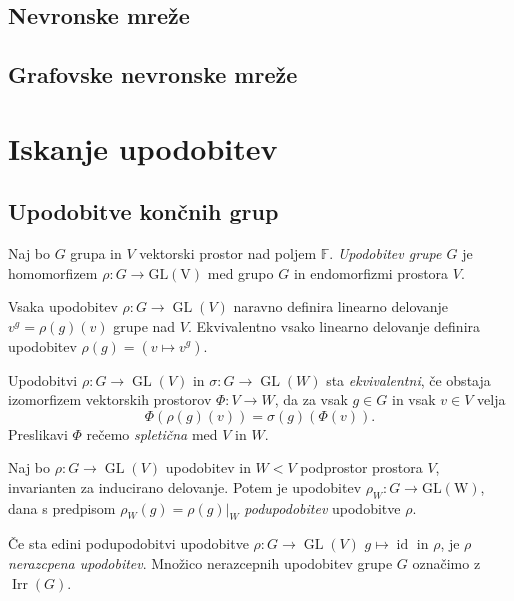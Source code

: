 \documentclass[mat2, tisk]{fmfdelo}
\begin{document}
    \subsection{Nevronske mreže}
    \subsection{Grafovske nevronske mreže}
\section{Iskanje upodobitev}
    \subsection{Upodobitve končnih grup}
    \begin{definicija}
        Naj bo $G$ grupa in $V$ vektorski prostor nad poljem $\mathbb{F}$. \emph{Upodobitev grupe $G$} je homomorfizem $ \rho \colon G \to \operatorname{GL(V)}$ med grupo $G$ in endomorfizmi prostora $V$.
    \end{definicija}
    Vsaka upodobitev $\rho \colon G \to \operatorname{GL}(V)$ naravno definira linearno delovanje $v ^ g = \rho(g)(v)$ grupe nad $V$. Ekvivalentno vsako linearno delovanje  definira upodobitev $\rho(g) = (v \mapsto v^g)$. 
    \begin{definicija}
        Upodobitvi $\rho \colon G \to \operatorname{GL}(V)$ in 
         $\sigma \colon G \to \operatorname{GL}(W)$ sta \emph{ekvivalentni}, če obstaja izomorfizem vektorskih prostorov $\Phi \colon  V \to W$, da za vsak $g \in G$ in vsak $v \in V$ velja 
         $$
         \Phi(\rho(g)(v)) = \sigma(g)(\Phi(v)).
         $$
         Preslikavi $\Phi$ rečemo \emph{spletična} med $V$ in $W$.
    \end{definicija}
    \begin{definicija}
        Naj bo $\rho: G \to \operatorname{GL}(V)$ upodobitev in $W < V$ podprostor prostora $V$, invarianten za inducirano delovanje. Potem je upodobitev
        $
        \rho_W \colon G \to \operatorname{GL(W)}
        $, dana s predpisom
        $\rho_W(g) = \rho(g)|_{W}$ \emph{podupodobitev} upodobitve $\rho$.
    \end{definicija}
    \begin{definicija}
        Če sta edini podupodobitvi upodobitve $\rho \colon G \to \operatorname{GL}(V)$ $g \mapsto \operatorname{id}$ in $\rho$, je $\rho$ \emph{nerazcpena upodobitev}. 
        Množico nerazcepnih upodobitev grupe $G$ označimo z $\operatorname{Irr}(G)$.
    \end{definicija}
\end{document}
